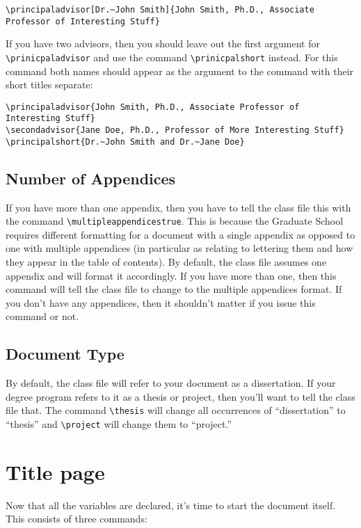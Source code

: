 \begin{verbatim}
\principaladvisor[Dr.~John Smith]{John Smith, Ph.D., Associate Professor of Interesting Stuff}
\end{verbatim}

If you have two advisors, then you should leave out the first argument for \verb=\prinicpaladvisor= and use the command \verb=\prinicpalshort= instead.  For this command both names should appear as the argument to the command with their short titles separate:

\begin{verbatim}
\principaladvisor{John Smith, Ph.D., Associate Professor of Interesting Stuff}
\secondadvisor{Jane Doe, Ph.D., Professor of More Interesting Stuff}
\principalshort{Dr.~John Smith and Dr.~Jane Doe}
\end{verbatim}

\subsection{Number of Appendices}
If you have more than one appendix, then you have to tell the class file this with the command \verb=\multipleappendicestrue=.  This is because the Graduate School requires different formatting for a document with a single appendix as opposed to one with multiple appendices (in particular as relating to lettering them and how they appear in the table of contents).  By default, the class file assumes one appendix and will format it accordingly.  If you have more than one, then this command will tell the class file to change to the multiple appendices format.  If you don't have any appendices, then it shouldn't matter if you issue this command or not.

\subsection{Document Type}
By default, the class file will refer to your document as a dissertation.  If your degree program refers to it as a thesis or project, then you'll want to tell the class file that.  The command \verb=\thesis= will change all occurrences of ``dissertation'' to ``thesis'' and \verb=\project= will change them to ``project.''

\section{Title page}

Now that all the variables are declared, it's time to start the document itself.  This consists of three commands:

